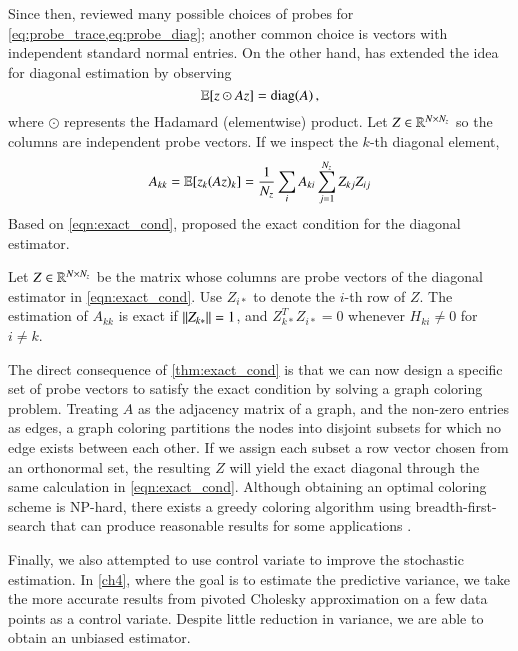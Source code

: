 Since then, \citet{avron2011randomized} reviewed many possible choices of probes
for \cref{eq:probe_trace,eq:probe_diag}; another common choice is vectors with
independent standard normal entries. On the other hand,  
\citet{bekas2007estimator} has extended the idea for diagonal estimation by
observing
\begin{equation}\label{eq:probe_diag}
	\operatorname{\mathbb{E}}[z\odot Az] = \operatorname{diag}(A)\,,
\end{equation}
where $\odot$ represents the Hadamard (elementwise) product. Let $Z\in\mathbb{R}^
{N\mathbin{\times} N_z}$ so the columns are independent probe vectors. If we inspect the
$k$\hyp{}th diagonal element,
\begin{equation}\label{eqn:exact_cond}
	A_{kk} = \operatorname{\mathbb{E}}[z_k(Az)_k] = \frac{1}{N_z}\sum_{i}A_{ki}\sum_{j=1}^{N_z}Z_{kj}Z_
	{ij}
\end{equation}
Based on \cref{eqn:exact_cond}, \citet{bekas2007estimator} proposed the exact
condition for the diagonal estimator.

\begin{theorem}\label{thm:exact_cond}
Let $Z\in\mathbb{R}^{N\times N_z}$ be the matrix whose columns are probe vectors of
the diagonal estimator in \cref{eqn:exact_cond}. Use $Z_{i\ast}$ to denote the
$i$\hyp{}th row of $Z$. The estimation of $A_{kk}$ is exact if $\left\lVert Z_
{k\ast}\right\rVert = 1$, and $Z_{k\ast}^TZ_{i\ast} = 0$ whenever $H_{ki}\neq 0$ for $i\neq
k$.
\end{theorem}

The direct consequence of \cref{thm:exact_cond} is that we can now design a
specific set of probe vectors to satisfy the exact condition by solving a graph
coloring problem. Treating $A$ as the adjacency matrix of a graph, and the
non\hyp{}zero entries as edges, a graph coloring partitions the nodes into
disjoint subsets for which no edge exists between each other. If we assign each
subset a row vector chosen from an orthonormal set, the resulting $Z$ will yield
the exact diagonal through the same calculation in \cref{eqn:exact_cond}.
Although obtaining an optimal coloring scheme is NP\hyp{}hard, there exists a
greedy coloring algorithm using breadth\hyp{}first\hyp{}search that can produce
reasonable results for some applications \cite[Theorem~28.33]
{arumugam2016handbook}.

Finally, we also attempted to use control variate to improve the stochastic
estimation. In \cref{ch4}, where the goal is to estimate the predictive
variance, we take the more accurate results from pivoted Cholesky approximation
on a few data points as a control variate. Despite little reduction in variance,
we are able to obtain an unbiased estimator.

